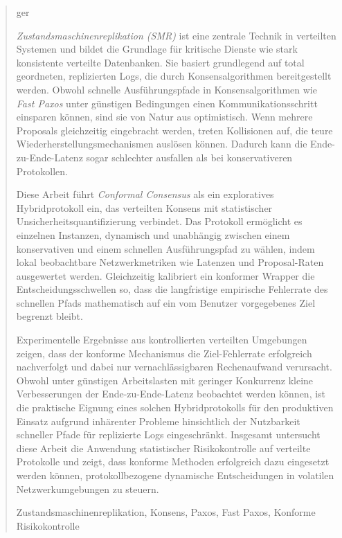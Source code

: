 \begin{abstract}
    \markboth{\abstractname}{}
\begin{scontents}[store-env=lang]
ger
\end{scontents}
\begin{scontents}[store-env=abstracts,print-env=true]
    \textit{Zustandsmaschinenreplikation (SMR)} ist eine zentrale Technik in verteilten Systemen und bildet die Grundlage für kritische Dienste wie stark konsistente verteilte Datenbanken. Sie basiert grundlegend auf total geordneten, replizierten Logs, die durch Konsensalgorithmen bereitgestellt werden. Obwohl schnelle Ausführungspfade in Konsensalgorithmen wie \textit{Fast Paxos} unter günstigen Bedingungen einen Kommunikationsschritt einsparen können, sind sie von Natur aus optimistisch. Wenn mehrere Proposals gleichzeitig eingebracht werden, treten Kollisionen auf, die teure Wiederherstellungsmechanismen auslösen können. Dadurch kann die Ende-zu-Ende-Latenz sogar schlechter ausfallen als bei konservativeren Protokollen.
    
    Diese Arbeit führt \textit{Conformal Consensus} als ein exploratives Hybridprotokoll ein, das verteilten Konsens mit statistischer Unsicherheitsquantifizierung verbindet. Das Protokoll ermöglicht es einzelnen Instanzen, dynamisch und unabhängig zwischen einem konservativen und einem schnellen Ausführungspfad zu wählen, indem lokal beobachtbare Netzwerkmetriken wie Latenzen und Proposal-Raten ausgewertet werden. Gleichzeitig kalibriert ein konformer Wrapper die Entscheidungsschwellen so, dass die langfristige empirische Fehlerrate des schnellen Pfads mathematisch auf ein vom Benutzer vorgegebenes Ziel begrenzt bleibt.
    
    Experimentelle Ergebnisse aus kontrollierten verteilten Umgebungen zeigen, dass der konforme Mechanismus die Ziel-Fehlerrate erfolgreich nachverfolgt und dabei nur vernachlässigbaren Rechenaufwand verursacht. Obwohl unter günstigen Arbeitslasten mit geringer Konkurrenz kleine Verbesserungen der Ende-zu-Ende-Latenz beobachtet werden können, ist die praktische Eignung eines solchen Hybridprotokolls für den produktiven Einsatz aufgrund inhärenter Probleme hinsichtlich der Nutzbarkeit schneller Pfade für replizierte Logs eingeschränkt. Insgesamt untersucht diese Arbeit die Anwendung statistischer Risikokontrolle auf verteilte Protokolle und zeigt, dass konforme Methoden erfolgreich dazu eingesetzt werden können, protokollbezogene dynamische Entscheidungen in volatilen Netzwerkumgebungen zu steuern.
\end{scontents}

\begin{scontents}[store-env=keywords,print-env=true]
Zustandsmaschinenreplikation, Konsens, Paxos, Fast Paxos, Konforme Risikokontrolle
\end{scontents}
\end{abstract}
\cleardoublepage
{}

